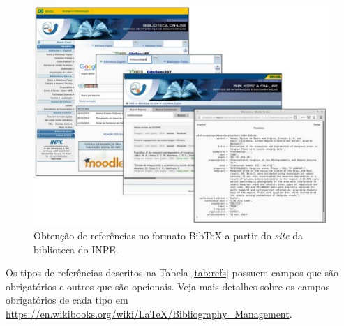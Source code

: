 \begin{figure}[H]
\caption{Obtenção de referências no formato Bib\TeX{} a partir do \textit{site} da biblioteca do INPE.}
\vspace{6mm}
    \begin{center}
        \includegraphics[scale=0.45]{./docs/figs/bibliotex.pdf}
    \end{center}
\vspace{4mm}
\label{fig:bibliotex}
\end{figure}

\begin{marker}
Os tipos de referências descritos na Tabela \ref{tab:refs} possuem campos que são obrigatórios e outros que são opcionais. Veja mais detalhes sobre os campos obrigatórios de cada tipo em \url{https://en.wikibooks.org/wiki/LaTeX/Bibliography_Management}.
\end{marker}




